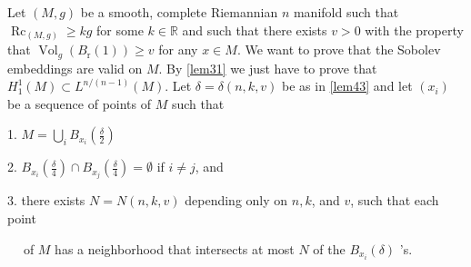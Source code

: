 \documentclass[12pt,hyperref,a4paper,UTF8]{ctexart}
\begin{document}
\vskip 3pt
\begin{Proof2}
Let $(M, g)$ be a smooth, complete Riemannian $n$ manifold such that $\operatorname{Rc}_{(M, g)} \geq k g$ for some $k \in \mathbb{R}$ and such that there exists $v>0$ with the property that $\operatorname{Vol}_g\left(B_{\mathrm{r}}(1)\right) \geq v$ for any $x \in M$. We want to prove that the Sobolev embeddings are valid on $M$. By \autoref{lem31} we just have to prove that $H_1^{1}(M) \subset L^{n /(n-1)}(M)$. Let $\delta=\delta(n, k, v)$ be as in \autoref{lem43} and let $\left(x_i\right)$ be a sequence of points of $M$ such that

1. $M=\bigcup_i B_{x_i}\left(\frac{\delta}{2}\right)$

2. $B_{x_i}\left(\frac{\delta}{4}\right) \cap B_{x_j}\left(\frac{\delta}{4}\right)=\emptyset$ if $i \neq j$, and

3. there exists $N=N(n, k, v)$ depending only on $n, k$, and $v$, such that each point 

$\quad\;$of $M$ has a neighborhood that intersects at most $N$ of the $B_{x_i}(\delta)$ 's.


\end{Proof2}
\end{document}
